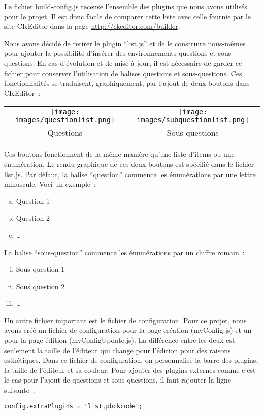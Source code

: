 Le fichier build-config.js recense l'ensemble des plugins que nous avons utilisés pour le projet. Il est donc facile de comparer cette liste avec celle fournie par le site CKEditor dans la page \url{http://ckeditor.com/builder}.   

Nous avons décidé de retirer le plugin \enquote{list.js} et de le construire nous-mêmes pour ajouter la possibilité d'insérer des environnements questions et sous-questions. En cas d'évolution et de mise à jour, il est nécessaire de garder ce fichier pour conserver l'utilisation de balises questions et sous-questions. Ces fonctionnalités se traduisent, graphiquement, par l'ajout de deux boutons dans CKEditor~:

\begin{center}
\begin{tabular}{cc}
\texttt{[image: images/questionlist.png]}
&
\texttt{[image: images/subquestionlist.png]}
\\
Questions
&
Sous-questions
\\
\end{tabular}
\end{center}

Ces boutons fonctionnent de la même manière qu'une liste d'items ou une énumération. Le rendu graphique de ces deux boutons est spécifié dans le fichier list.js. Par défaut, la balise \enquote{question} commence les énumérations par une lettre minuscule. Voci un exemple~:
 
\begin{enumerate}[a)]
\item Question 1
\item Question 2
\item \ldots	
\end{enumerate} 

La balise \enquote{sous-question} commence les énumérations par un chiffre romain~:
\begin{enumerate}[i)]
\item Sous question 1
\item Sous question 2
\item \ldots
\end{enumerate} 

Un autre fichier important est le fichier de configuration. Pour ce projet, nous avons créé un fichier de configuration pour la page création (myConfig.js) et un pour la page édition (myConfigUpdate.js). La différence entre les deux est seulement la taille de l'éditeur qui change pour l'édition pour des raisons esthétiques. Dans ce fichier de configuration, on personnalise la barre des plugins, la taille de l'éditeur et sa couleur. Pour ajouter des plugins externes comme c'est le cas pour l'ajout de questions et sous-questions, il faut rajouter la ligne suivante~:
\lstset{style=customJavaScript}
\begin{lstlisting}
config.extraPlugins = 'list,pbckcode';
\end{lstlisting}

